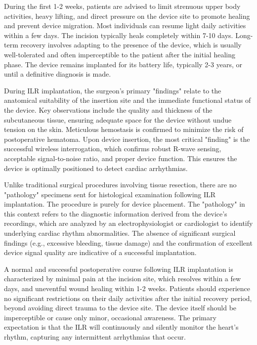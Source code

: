 During the first 1-2 weeks, patients are advised to limit strenuous upper body activities, heavy lifting, and direct pressure on the device site to promote healing and prevent device migration. Most individuals can resume light daily activities within a few days. The incision typically heals completely within 7-10 days. Long-term recovery involves adapting to the presence of the device, which is usually well-tolerated and often imperceptible to the patient after the initial healing phase. The device remains implanted for its battery life, typically 2-3 years, or until a definitive diagnosis is made.

During ILR implantation, the surgeon's primary "findings" relate to the anatomical suitability of the insertion site and the immediate functional status of the device. Key observations include the quality and thickness of the subcutaneous tissue, ensuring adequate space for the device without undue tension on the skin. Meticulous hemostasis is confirmed to minimize the risk of postoperative hematoma. Upon device insertion, the most critical "finding" is the successful wireless interrogation, which confirms robust R-wave sensing, acceptable signal-to-noise ratio, and proper device function. This ensures the device is optimally positioned to detect cardiac arrhythmias.

Unlike traditional surgical procedures involving tissue resection, there are no "pathology" specimens sent for histological examination following ILR implantation. The procedure is purely for device placement. The "pathology" in this context refers to the diagnostic information derived from the device's recordings, which are analyzed by an electrophysiologist or cardiologist to identify underlying cardiac rhythm abnormalities. The absence of significant surgical findings (e.g., excessive bleeding, tissue damage) and the confirmation of excellent device signal quality are indicative of a successful implantation.

A normal and successful postoperative course following ILR implantation is characterized by minimal pain at the incision site, which resolves within a few days, and uneventful wound healing within 1-2 weeks. Patients should experience no significant restrictions on their daily activities after the initial recovery period, beyond avoiding direct trauma to the device site. The device itself should be imperceptible or cause only minor, occasional awareness. The primary expectation is that the ILR will continuously and silently monitor the heart's rhythm, capturing any intermittent arrhythmias that occur.

